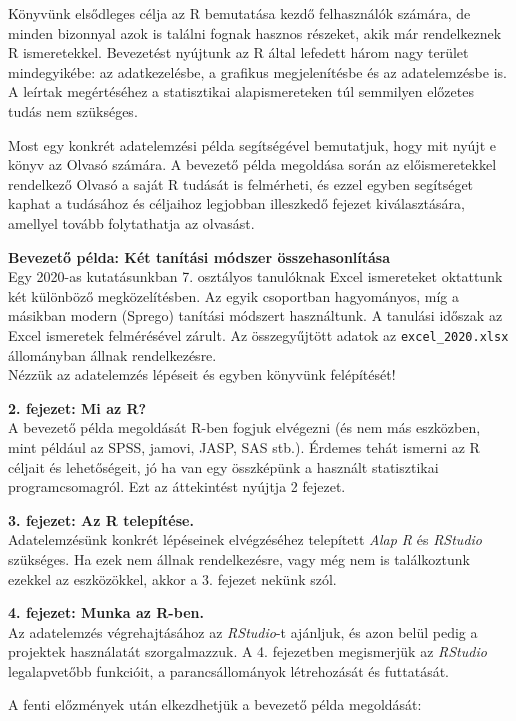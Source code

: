 \documentclass[
]{book}
\begin{document}
Könyvünk elsődleges célja az R bemutatása kezdő felhasználók számára, de minden bizonnyal azok is találni fognak hasznos részeket, akik már rendelkeznek R ismeretekkel. Bevezetést nyújtunk az R által lefedett három nagy terület mindegyikébe: az adatkezelésbe, a grafikus megjelenítésbe és az adatelemzésbe is. A leírtak megértéséhez a statisztikai alapismereteken túl semmilyen előzetes tudás nem szükséges.

Most egy konkrét adatelemzési példa segítségével bemutatjuk, hogy mit nyújt e könyv az Olvasó számára. A bevezető példa megoldása során az előismeretekkel rendelkező Olvasó a saját R tudását is felmérheti, és ezzel egyben segítséget kaphat a tudásához és céljaihoz legjobban illeszkedő fejezet kiválasztására, amellyel tovább folytathatja az olvasást.

\textbf{Bevezető példa: Két tanítási módszer összehasonlítása}\\
Egy 2020-as kutatásunkban \citep{Csapo2020} 7. osztályos tanulóknak Excel ismereteket oktattunk két különböző megközelítésben. Az egyik csoportban hagyományos, míg a másikban modern (Sprego) tanítási módszert használtunk. A tanulási időszak az Excel ismeretek felmérésével zárult. Az összegyűjtött adatok az \texttt{excel\_2020.xlsx} állományban állnak rendelkezésre.\\
Nézzük az adatelemzés lépéseit és egyben könyvünk felépítését!

\textbf{2. fejezet: Mi az R?}\\
A bevezető példa megoldását R-ben fogjuk elvégezni (és nem más eszközben, mint például az SPSS, jamovi, JASP, SAS stb.). Érdemes tehát ismerni az R céljait és lehetőségeit, jó ha van egy összképünk a használt statisztikai programcsomagról. Ezt az áttekintést nyújtja 2 fejezet.

\textbf{3. fejezet: Az R telepítése.}\\
Adatelemzésünk konkrét lépéseinek elvégzéséhez telepített \emph{Alap R} és \emph{RStudio} szükséges. Ha ezek nem állnak rendelkezésre, vagy még nem is találkoztunk ezekkel az eszközökkel, akkor a 3. fejezet nekünk szól.

\textbf{4. fejezet: Munka az R-ben.}\\
Az adatelemzés végrehajtásához az \emph{RStudio}-t ajánljuk, és azon belül pedig a projektek használatát szorgalmazzuk. A 4. fejezetben megismerjük az \emph{RStudio} legalapvetőbb funkcióit, a parancsállományok létrehozását és futtatását.

A fenti előzmények után elkezdhetjük a bevezető példa megoldását:
\end{document}

